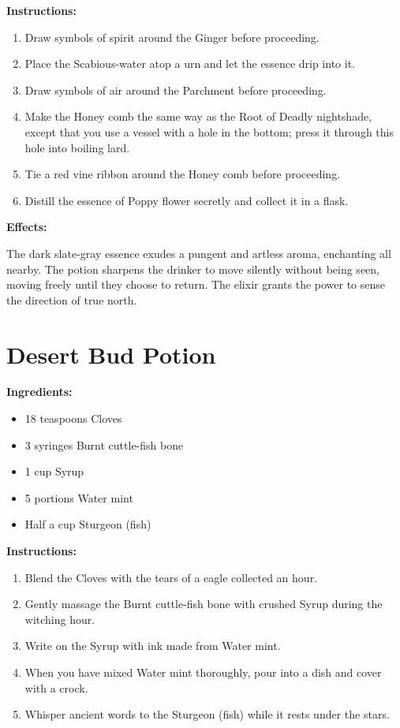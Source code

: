 \documentclass{article}
\begin{document}
\textbf{Instructions:}

\begin{enumerate}
  \item Draw symbols of spirit around the Ginger before proceeding.
  \item Place the Scabious-water atop a urn and let the essence drip into it.
  \item Draw symbols of air around the Parchment before proceeding.
  \item Make the Honey comb the same way as the Root of Deadly nightshade, except that you use a vessel with a hole in the bottom; press it through this hole into boiling lard.
  \item Tie a red vine ribbon around the Honey comb before proceeding.
  \item Distill the essence of Poppy flower secretly and collect it in a flask.
\end{enumerate}

\textbf{Effects:}

The dark slate-gray essence exudes a pungent and artless aroma, enchanting all nearby. The potion sharpens the drinker to move silently without being seen, moving freely until they choose to return. The elixir grants the power to sense the direction of true north.

\newpage
\section*{Desert Bud Potion}

\textbf{Ingredients:}

\begin{itemize}
  \item 18 teaspoons Cloves
  \item 3 syringes Burnt cuttle-fish bone
  \item 1 cup Syrup
  \item 5 portions Water mint
  \item Half a cup Sturgeon (fish)
\end{itemize}

\textbf{Instructions:}

\begin{enumerate}
  \item Blend the Cloves with the tears of a eagle collected an hour.
  \item Gently massage the Burnt cuttle-fish bone with crushed Syrup during the witching hour.
  \item Write on the Syrup with ink made from Water mint.
  \item When you have mixed Water mint thoroughly, pour into a dish and cover with a crock.
  \item Whisper ancient words to the Sturgeon (fish) while it rests under the stars.
\end{enumerate}
\end{document}
